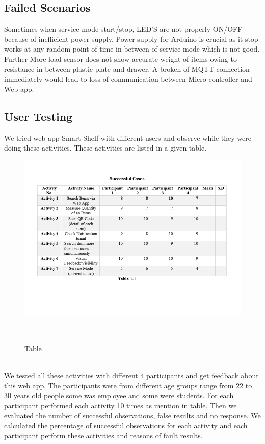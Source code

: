 \subsection{Failed Scenarios}
 Sometimes when service mode start/stop, LED'S are not properly ON/OFF because of inefficient power supply. Power supply for Arduino is crucial as it stop works at any random point of time in between of service mode which is not good. Further More load sensor does not show accurate weight of items owing to resistance in between plastic plate and drawer.
A broken of MQTT connection immediately would lead to loss of communication between Micro controller and Web app.
\subsection{User Testing} 
We tried web app Smart Shelf with different users and observe while they were doing these activities. These activities are listed in a given table.
%
\begin{figure}
	\includegraphics[width=1.1\columnwidth]{figures/table}
	\caption{Table}~\label{fig:table}
\end{figure}
%
\\
We tested all these activities with different 4 participants and get feedback about this web app. The participants were from different age groups range from 22 to 30 years old people some was employee and some were students. For each participant performed each activity 10 times as mention in table. Then we evaluated the number of successful observations, false results and no response. We calculated the percentage of successful observations for each activity and each participant perform these activities and reasons of fault results.


